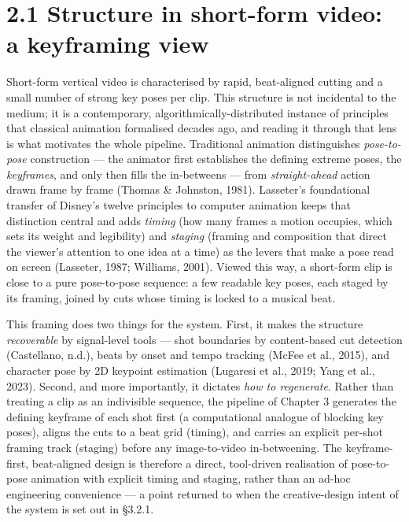 \documentclass[10pt,twocolumn,letterpaper]{article}
\begin{document}

\section*{2.1 Structure in short-form video: a keyframing view}

Short-form vertical video is characterised by rapid, beat-aligned cutting and a small number of strong key poses per clip. This structure is not incidental to the medium; it is a contemporary, algorithmically-distributed instance of principles that classical animation formalised decades ago, and reading it through that lens is what motivates the whole pipeline. Traditional animation distinguishes \emph{pose-to-pose} construction --- the animator first establishes the defining extreme poses, the \emph{keyframes}, and only then fills the in-betweens --- from \emph{straight-ahead} action drawn frame by frame (Thomas \& Johnston, 1981). Lasseter's foundational transfer of Disney's twelve principles to computer animation keeps that distinction central and adds \emph{timing} (how many frames a motion occupies, which sets its weight and legibility) and \emph{staging} (framing and composition that direct the viewer's attention to one idea at a time) as the levers that make a pose read on screen (Lasseter, 1987; Williams, 2001). Viewed this way, a short-form clip is close to a pure pose-to-pose sequence: a few readable key poses, each staged by its framing, joined by cuts whose timing is locked to a musical beat.

This framing does two things for the system. First, it makes the structure \emph{recoverable} by signal-level tools --- shot boundaries by content-based cut detection (Castellano, n.d.), beats by onset and tempo tracking (McFee et al., 2015), and character pose by 2D keypoint estimation (Lugaresi et al., 2019; Yang et al., 2023). Second, and more importantly, it dictates \emph{how to regenerate}. Rather than treating a clip as an indivisible sequence, the pipeline of Chapter 3 generates the defining keyframe of each shot first (a computational analogue of blocking key poses), aligns the cuts to a beat grid (timing), and carries an explicit per-shot framing track (staging) before any image-to-video in-betweening. The keyframe-first, beat-aligned design is therefore a direct, tool-driven realisation of pose-to-pose animation with explicit timing and staging, rather than an ad-hoc engineering convenience --- a point returned to when the creative-design intent of the system is set out in \S{}3.2.1.
\end{document}
